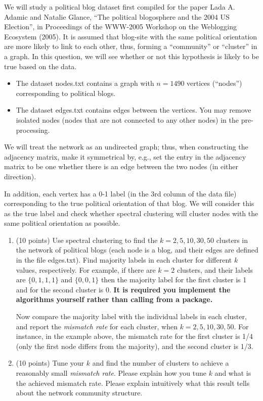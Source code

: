 \documentclass[twoside,10pt]{article}
\begin{document}
We will study a political blog dataset first compiled for the paper Lada A. Adamic and Natalie Glance, ``The political blogosphere and the 2004 US Election'', in Proceedings of the WWW-2005 Workshop on the Weblogging Ecosystem (2005). It is assumed that blog-site with the same political orientation are more likely to link to each other, thus, forming a ``community'' or ``cluster'' in a graph. In this question, we will see whether or not this hypothesis is likely to be true based on the data.
\begin{itemize}

\item The dataset \textsf{nodes.txt} contains a graph with $n = 1490$ vertices (``nodes'') corresponding to political blogs. 

\item The dataset \textsf{edges.txt} contains edges between the vertices. You may remove isolated nodes (nodes that are not connected to any other nodes) in the pre-processing. 

\end{itemize}

We will treat the network as an undirected graph; thus, when constructing the adjacency matrix, make it symmetrical by, e.g., set the entry in the adjacency matrix to be one whether there is an edge between the two nodes (in either direction). 

In addition, each vertex has a 0-1 label (in the 3rd column of the data file) corresponding to the true political orientation of that blog. We will consider this as the true label and check whether spectral clustering will cluster nodes with the same political orientation as possible. 

\begin{enumerate}

\item (10 points) Use spectral clustering to find the $k = 2, 5, 10, 30, 50$ clusters in the network of political blogs (each node is a blog, and their edges are defined in the file \textsf{edges.txt}). Find majority labels in each cluster for different $k$ values, respectively. For example, if there are $k = 2$ clusters, and their labels are $\{0, 1, 1, 1\}$ and $\{0, 0, 1\}$ then the majority label for the first cluster is 1 and for the second cluster is 0. {\bf It is required you implement the algorithms yourself rather than calling from a package.} 

Now compare the majority label with the individual labels in each cluster, and report the {\it mismatch rate} for each cluster, when $k = 2, 5, 10, 30, 50$. For instance, in the example above, the mismatch rate for the first cluster is 1/4 (only the first node differs from the majority), and the second cluster is 1/3. 

\item (10 points) Tune your $k$ and find the number of clusters to achieve a reasonably small {\it mismatch rate}. Please explain how you tune $k$ and what is the achieved mismatch rate. Please explain intuitively what this result tells about the network community structure.

\end{enumerate}
\end{document}

